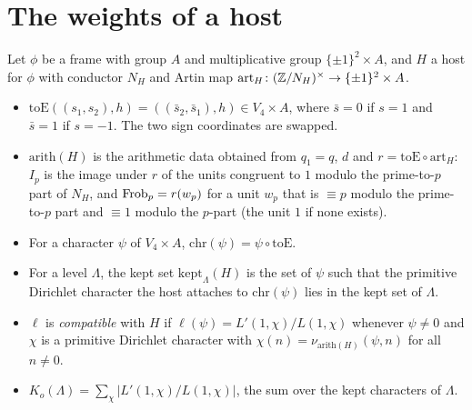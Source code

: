 \section{The weights of a host}

\begin{definition}\label{bal:to-E}
Let $\phi$ be a frame with group $A$ and multiplicative group $\{\pm1\}^2\times A$, and $H$ a host for $\phi$ with conductor $N_H$ and Artin map $\mathrm{art}_H\colon(\mathbb{Z}/N_H)^{\times}\to\{\pm1\}^2\times A$.
\begin{itemize}
\item $\mathrm{toE}((s_1,s_2),h)=((\bar s_2,\bar s_1),h)\in V_4\times A$, where $\bar s=0$ if $s=1$ and $\bar s=1$ if $s=-1$. The two sign coordinates are swapped.
\item $\mathrm{arith}(H)$ is the arithmetic data obtained from $q_1=q$, $d$ and $r=\mathrm{toE}\circ\mathrm{art}_H$: $I_p$ is the image under $r$ of the units congruent to $1$ modulo the prime-to-$p$ part of $N_H$, and $\operatorname{Frob}_p=r(w_p)$ for a unit $w_p$ that is $\equiv p$ modulo the prime-to-$p$ part and $\equiv1$ modulo the $p$-part (the unit $1$ if none exists).
\item For a character $\psi$ of $V_4\times A$, $\mathrm{chr}(\psi)=\psi\circ\mathrm{toE}$.
\item For a level $\Lambda$, the kept set $\mathrm{kept}_{\Lambda}(H)$ is the set of $\psi$ such that the primitive Dirichlet character the host attaches to $\mathrm{chr}(\psi)$ lies in the kept set of $\Lambda$.
\item $\ell$ is \emph{compatible} with $H$ if $\ell(\psi)=L'(1,\chi)/L(1,\chi)$ whenever $\psi\ne0$ and $\chi$ is a primitive Dirichlet character with $\chi(n)=\nu_{\mathrm{arith}(H)}(\psi,n)$ for all $n\ne0$.
\item $K_o(\Lambda)=\sum_{\chi}|L'(1,\chi)/L(1,\chi)|$, the sum over the kept characters of $\Lambda$.
\end{itemize}
\end{definition}

